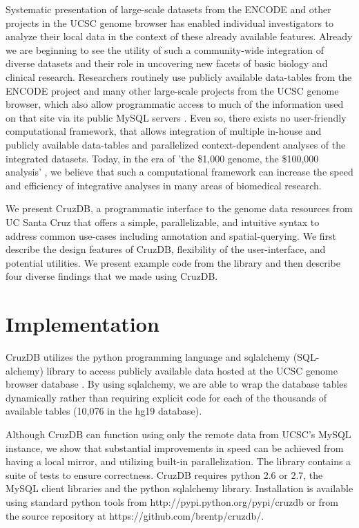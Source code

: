 \documentclass[10pt]{bmc_article}
\newenvironment{bmcformat}{\baselineskip20pt\sloppy\setboolean{publ}{false}}{\baselineskip20pt\sloppy}
\begin{document}
\begin{bmcformat}
Systematic presentation of large-scale datasets from the ENCODE \cite{ENCODE} and other projects in the UCSC genome browser \cite{KentBrowser} has enabled individual investigators to analyze their local data in the context of these already available features. Already we are beginning to see the utility of such a community-wide integration of diverse datasets and their role in uncovering new facets of basic biology and clinical research. Researchers routinely use publicly available data-tables from the ENCODE project and many other large-scale projects from the UCSC genome browser, which also allow programmatic access to much of the information used on that site via its public MySQL servers \cite{Dreszer}. Even so, there exists no user-friendly computational framework, that allows integration of multiple in-house and publicly available data-tables and parallelized context-dependent analyses of the integrated datasets. Today, in the era of 'the \$1,000 genome, the \$100,000 analysis' \cite{Mardis}, we believe that such a computational framework can increase the speed and efficiency of integrative analyses in many areas of biomedical research. 

We present CruzDB, a programmatic interface to the genome data resources from UC Santa Cruz \cite{Dreszer} that offers a simple, parallelizable, and intuitive syntax to address common use-cases including annotation and spatial-querying. 
We first describe the design features of CruzDB, flexibility of the user-interface, and potential utilities. 
We present example code from the library and then describe four diverse findings that we made using CruzDB.


\section*{Implementation}
CruzDB utilizes the python programming language and sqlalchemy (SQL-alchemy) library to access publicly available data hosted at the UCSC genome browser database\cite{Dreszer} . By using sqlalchemy, we are able to wrap the database tables dynamically rather than requiring explicit code for each of the thousands of available tables (10,076 in the hg19 database). 

Although CruzDB can function using only the remote data from UCSC's MySQL instance, we show that  substantial improvements in speed can be achieved from having a local mirror, and utilizing built-in parallelization. The library contains a suite of tests to ensure correctness. CruzDB requires python 2.6 or 2.7, the MySQL client libraries and the python sqlalchemy library. Installation is available using standard python tools from http://pypi.python.org/pypi/cruzdb or from the source repository at https://github.com/brentp/cruzdb/.


\end{bmcformat}
\end{document}
